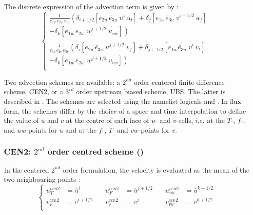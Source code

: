 \documentclass[../tex_main/NEMO_manual]{subfiles}
\begin{document}
The discrete expression of the advection term is given by :
\begin{equation} \label{eq:dynadv}
\left\{ 
\begin{aligned}
\frac{1}{e_{1u}\,e_{2u}\,e_{3u}} 
\left(      \delta _{i+1/2} \left[ \overline{e_{2u}\,e_{3u}\;u }^{i       }  \ u_t      \right]    
          + \delta _{j       } \left[ \overline{e_{1u}\,e_{3u}\;v }^{i+1/2}  \ u_f      \right] \right.  \ \;   \\
\left.   + \delta _{k      } \left[ \overline{e_{1w}\,e_{2w}\;w}^{i+1/2}  \ u_{uw} \right] \right)   \\
\\
\frac{1}{e_{1v}\,e_{2v}\,e_{3v}} 
\left(     \delta _{i       } \left[ \overline{e_{2u}\,e_{3u }\;u }^{j+1/2} \ v_f       \right] 
         + \delta _{j+1/2} \left[ \overline{e_{1u}\,e_{3u }\;v }^{i       } \ v_t       \right] \right.  \ \, \, \\
\left.  + \delta _{k      } \left[ \overline{e_{1w}\,e_{2w}\;w}^{j+1/2} \ v_{vw}  \right] \right) \\
\end{aligned}
\right.
\end{equation}

Two advection schemes are available: a $2^{nd}$ order centered finite 
difference scheme, CEN2, or a $3^{rd}$ order upstream biased scheme, UBS. 
The latter is described in \citet{Shchepetkin_McWilliams_OM05}. The schemes are 
selected using the namelist logicals  and . 
In flux form, the schemes differ by the choice of a space and time interpolation to 
define the value of $u$ and $v$ at the centre of each face of $u$- and $v$-cells, 
$i.e.$ at the $T$-, $f$-, and $uw$-points for $u$ and at the $f$-, $T$- and 
$vw$-points for $v$. 

\subsubsection{CEN2: $2^{nd}$ order centred scheme (\protect{})}
\label{subsec:DYN_adv_cen2}

In the centered $2^{nd}$ order formulation, the velocity is evaluated as the 
mean of the two neighbouring points :
\begin{equation} \label{eq:dynadv_cen2}
\left\{ 		\begin{aligned}
 u_T^{cen2} &=\overline u^{i }       \quad &  u_F^{cen2} &=\overline u^{j+1/2}  \quad &  u_{uw}^{cen2} &=\overline u^{k+1/2}   \\
 v_F^{cen2} &=\overline v ^{i+1/2} \quad & v_F^{cen2} &=\overline v^j		\quad &  v_{vw}^{cen2} &=\overline v ^{k+1/2}  \\
\end{aligned}      \right.
\end{equation} 
\end{document}
